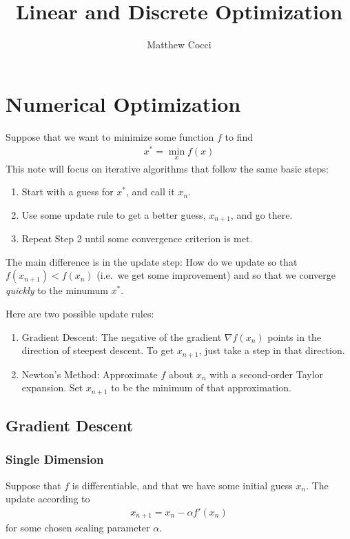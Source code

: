 \documentclass[a4paper,12pt]{scrartcl}
\author{Matthew Cocci}
\title{Linear and Discrete Optimization}
\date{}
\theoremstyle{definition}
\theoremstyle{remark}
\begin{document}
\maketitle


\section{Numerical Optimization}

Suppose that we want to minimize some function $f$ to find
\begin{align}
  \label{statement}
  x^* = \min_x f(x)
\end{align}
This note will focus on iterative algorithms that follow the same basic
steps:
\begin{enumerate}
  \item Start with a guess for $x^*$, and call it $x_n$.
  \item Use some update rule to get a better guess, $x_{n+1}$, and go
    there.
  \item Repeat Step 2 until some convergence criterion is met.
\end{enumerate}
The main difference is in the update step: How do we update so that
$f(x_{n+1}) < f(x_n)$ (i.e.\ we get some improvement) and so that we
converge \emph{quickly} to the minumum $x^*$.

Here are two possible update rules:
\begin{enumerate}
  \item Gradient Descent: The negative of the gradient $\nabla f(x_n)$
    points in the direction of steepest descent. To get $x_{n+1}$, just
    take a step in that direction.
  \item Newton's Method: Approximate $f$ about $x_n$ with a second-order
    Taylor expansion. Set $x_{n+1}$ to be the minimum of that approximation.
\end{enumerate}


\subsection{Gradient Descent}

\subsubsection{Single Dimension}

Suppose that $f$ is differentiable, and that we have some initial guess
$x_n$. The update according to
\begin{align*}
  x_{n+1} = x_n - \alpha f'(x_n)
\end{align*}
for some chosen scaling parameter $\alpha$.
\end{document}
